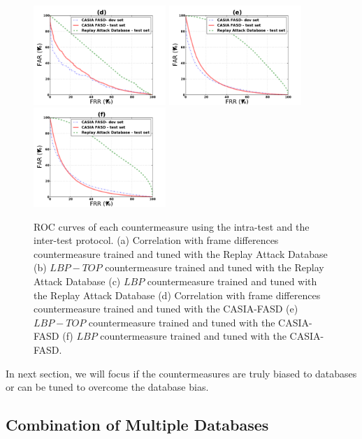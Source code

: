 \begin{figure}[ht]
\begin{center}
\includegraphics [width=5cm] {plots/CROSS-DATABASE/MOTION/roc_casia_fasd-machine.pdf} 
\includegraphics [width=5cm] {plots/CROSS-DATABASE/LBPTOP/roc_casia_fasd-machine.pdf}
\includegraphics [width=5cm] {plots/CROSS-DATABASE/LBP/roc_casia_fasd-machine.pdf}

\caption{ROC curves of each countermeasure using the intra-test and the inter-test protocol. (a) Correlation with frame differences countermeasure trained and tuned with the Replay Attack Database (b) $LBP-TOP$ countermeasure trained and tuned with the Replay Attack Database (c) $LBP$ countermeasure trained and tuned with the Replay Attack Database (d) Correlation with frame differences countermeasure trained and tuned with the CASIA-FASD (e) $LBP-TOP$ countermeasure trained and tuned with the CASIA-FASD (f) $LBP$ countermeasure trained and tuned with the CASIA-FASD.} 
\label{fig:ROC_cross}
\end{center}
\end{figure}

In next section, we will focus if the countermeasures are truly biased to databases or can be tuned to overcome the database bias.

\subsection{Combination of Multiple Databases}
\label{sec:combination}

